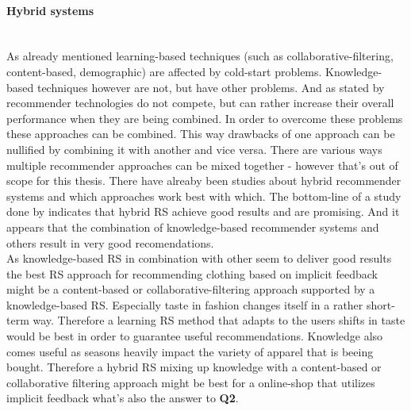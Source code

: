 \paragraph{Hybrid systems}\hfill\\
As already mentioned learning-based techniques (such as collaborative-filtering, content-based, demographic) are affected by cold-start problems.
Knowledge-based techniques however are not, but have other problems.
And as stated by \citeauthor{herlocker:2000} recommender technologies do not compete, but can rather increase their overall performance when they are being combined.\citep[p.~241]{herlocker:2000}
In order to overcome these problems these approaches can be combined.
This way drawbacks of one approach can be nullified by combining it with another and vice versa.
There are various ways multiple recommender approaches can be mixed together - however that's out of scope for this thesis.
\citep[p.~378-380]{burke:2007}
There have alreaby been studies about hybrid recommender systems and which approaches work best with which.
The bottom-line of a study done by \citeauthor{burke:2007} indicates that hybrid RS achieve good results and are promising.
And it appears that the combination of knowledge-based recommender systems and others result in very good recomendations.
\citep[p.~405-406]{burke:2007}
\\

\noindent
As knowledge-based RS in combination with other seem to deliver good results the best RS approach for recommending clothing based on implicit feedback might be a content-based or collaborative-filtering approach supported by a knowledge-based RS.
Especially taste in fashion changes itself in a rather short-term way.
Therefore a learning RS method that adapts to the users shifts in taste would be best in order to guarantee useful recommendations.
Knowledge also comes useful as seasons heavily impact the variety of apparel that is beeing bought.
Therefore a hybrid RS mixing up knowledge with a content-based or collaborative filtering approach might be best for a online-shop that utilizes implicit feedback what's also the answer to \textbf{Q2}.

